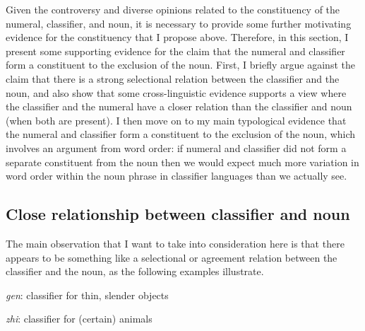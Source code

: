 \documentclass[output=paper
,modfonts
,nonflat]{langsci/langscibook}
\begin{document}
Given the controversy and diverse opinions related to the constituency of the numeral, classifier, and noun, it is necessary to provide some further motivating evidence for the constituency that I propose above. Therefore, in this section, I present some supporting evidence for the claim that the numeral and classifier form a constituent to the exclusion of the noun. First, I briefly argue against the claim that there is a strong selectional relation between the classifier and the noun, and also show that some cross-linguistic evidence supports a view where the classifier and the numeral have a closer relation than the classifier and noun (when both are present). I then move on to my main typological evidence that the numeral and classifier form a constituent to the exclusion of the noun, which involves an argument from word order: if numeral and classifier did not form a separate constituent from the noun then we would expect much more variation in word order within the noun phrase in classifier languages than we actually see.
 
\subsection{Close relationship between classifier and noun} 

The main observation that I want to take into consideration here is that there appears to be something like a selectional or agreement relation between the classifier and the noun, as the following examples illustrate.

\ea \label{ex:hall:40} 
\textit{gen}: classifier for thin, slender objects

\z
\z

\ea \label{ex:hall:41} 
\textit{zhi}: classifier for (certain) animals

\z 
\z
\end{document}
